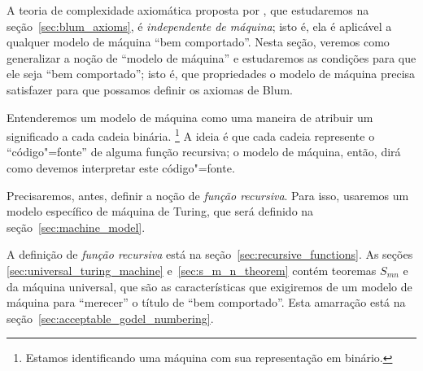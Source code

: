 A teoria de complexidade axiomática proposta por ,
que estudaremos na seção~\ref{sec:blum_axioms},
é \emph{independente de máquina};
isto é,
ela é aplicável a qualquer modelo de máquina ``bem comportado''.
Nesta seção,
veremos como generalizar a noção de ``modelo de máquina''
e estudaremos as condições para que ele seja ``bem comportado'';
isto é,
que propriedades o modelo de máquina precisa satisfazer
para que possamos definir os axiomas de Blum.

Entenderemos um modelo de máquina como
uma maneira de atribuir um significado a cada cadeia binária.%
\footnote{
    Estamos identificando uma máquina com sua representação em binário.
}
A ideia é que cada cadeia represente o ``código"=fonte''
de alguma função recursiva;
o modelo de máquina, então,
dirá como devemos interpretar este código"=fonte.

Precisaremos, antes,
definir a noção de \emph{função recursiva}.
Para isso,
usaremos um modelo específico de máquina de Turing,
que será definido na seção~\ref{sec:machine_model}.

A definição de \emph{função recursiva} está na seção~\ref{sec:recursive_functions}.
As seções \ref{sec:universal_turing_machine} e~\ref{sec:s_m_n_theorem}
contém teoremas $S_{mn}$ e da máquina universal,
que são as características que exigiremos de um modelo de máquina
para ``merecer'' o título de ``bem comportado''.
Esta amarração está na seção~\ref{sec:acceptable_godel_numbering}.
